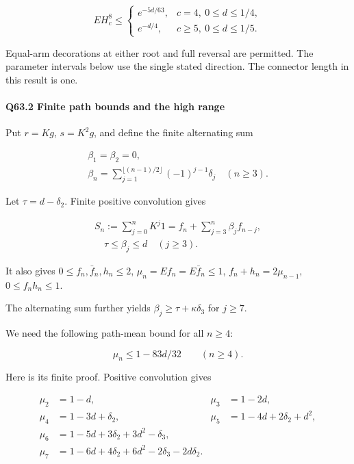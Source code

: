 \[
EH_c^8\le
\begin{cases}
e^{-5d/63},&c=4,\ 0\le d\le1/4,\\
e^{-d/4},&c\ge5,\ 0\le d\le1/5.
\end{cases}
\tag{Q63.1.3}\label{eq:Q63:Q63:1:3}
\]

Equal-arm decorations at either root and full reversal are permitted.
The parameter intervals below use the single stated direction.
The connector length in this result is one.

\paragraph{Q63.2 Finite path bounds and the high range}

Put $r=\allowbreak Kg$, $s=\allowbreak K^2g$, and define the finite alternating sum

\[
\begin{gathered}
\beta_1=\beta_2=0,\qquad\\
\beta_n=\sum_{j=1}^{\lfloor(n-1)/2\rfloor}(-1)^{j-1}\delta_j\quad(n\ge3).
\end{gathered}
\]

Let $\tau=\allowbreak d-\delta_2$. Finite positive convolution gives

\[
\begin{gathered}
S_n:=\sum_{j=0}^nK^j1=f_n+\sum_{j=3}^n\beta_j f_{n-j},\\
\quad \tau\le\beta_j\le d\quad(j\ge3).
\end{gathered}\tag{Q63.2.1}\label{eq:Q63:Q63:2:1}
\]

It also gives $0\le\allowbreak  f_n,\allowbreak  \bar f_n,\allowbreak  h_n\le\allowbreak 2$, $\mu_n=\allowbreak Ef_n=\allowbreak E\bar f_n\le\allowbreak 1$,
\(f_n+h_n=\allowbreak 2\mu_{n-1},\allowbreak \) \(0\le\allowbreak  f_nh_n\le\allowbreak  1.\)

The alternating sum further yields $\beta_j\ge\allowbreak \tau+\kappa \delta_3$ for $j\ge\allowbreak 7$.

We need the following path-mean bound for all $n\ge\allowbreak 4$:

\[
\mu_n\le1-83d/32\qquad(n\ge4).
\tag{Q63.2.2}\label{eq:Q63:Q63:2:2}
\]

Here is its finite proof. Positive convolution gives

\[
\begin{aligned}
\mu_2&=1-d,&\mu_3&=1-2d,\\
\mu_4&=1-3d+\delta_2,&\mu_5&=1-4d+2\delta_2+d^2,\\
\mu_6&=1-5d+3\delta_2+3d^2-\delta_3,\\
\mu_7&=1-6d+4\delta_2+6d^2-2\delta_3-2d\delta_2.
\end{aligned}
\]

